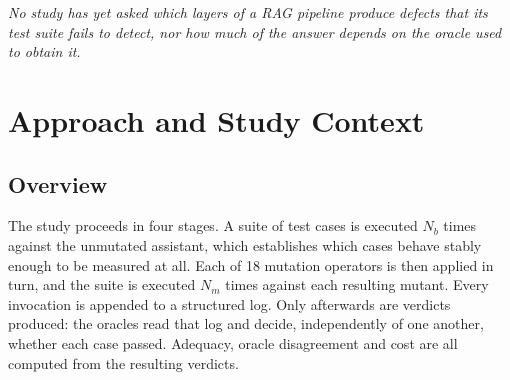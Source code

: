 \documentclass[a4paper,fleqn]{cas-dc}
\begin{document}
\emph{No study has yet asked which layers of a RAG pipeline produce defects
that its test suite fails to detect, nor how much of the answer depends on the
oracle used to obtain it.}

\section{Approach and Study Context}
\label{sec:context}

\subsection{Overview}
\label{sec:overview}

The study proceeds in four stages. A suite of test cases is executed $N_b$
times against the unmutated assistant, which establishes which cases behave
stably enough to be measured at all. Each of 18 mutation operators is then
applied in turn, and the suite is executed $N_m$ times against each resulting
mutant. Every invocation is appended to a structured log. Only afterwards are
verdicts produced: the oracles read that log and decide, independently of one
another, whether each case passed. Adequacy, oracle disagreement and cost are
all computed from the resulting verdicts.
\end{document}
